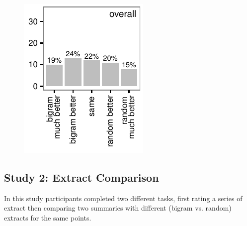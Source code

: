 \begin{figure}
\begin{minipage}{.5\textwidth}
		  \label{fig:scatter}
		\end{minipage}%
		\begin{minipage}{.25\textwidth}
		  \centering
		  \includegraphics[width=\textwidth]{graphs/bigram_vs_random_hists}
		  \label{fig:bigram_vs_random_hist}
		\end{minipage}%
	  \end{figure}

    \tocless\subsection{Study 2: Extract Comparison}
			In this study participants completed two different tasks, first rating a series of extract then comparing two summaries with different (bigram vs. random) extracts for the same points.

